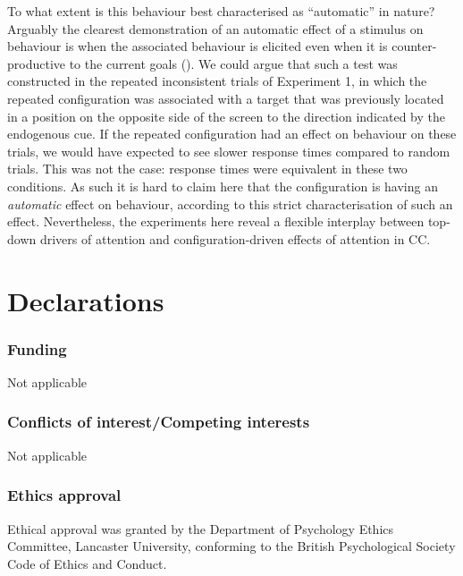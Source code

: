\documentclass[
  man,
  floatsintext,
  longtable,
  nolmodern,
  notxfonts,
  notimes,
  colorlinks=true,linkcolor=blue,citecolor=blue,urlcolor=blue]{apa7}
\begin{document}
To what extent is this behaviour best characterised as ``automatic'' in
nature? Arguably the clearest demonstration of an automatic effect of a
stimulus on behaviour is when the associated behaviour is elicited even
when it is counter-productive to the current goals
(). We could argue
that such a test was constructed in the repeated inconsistent trials of
Experiment 1, in which the repeated configuration was associated with a
target that was previously located in a position on the opposite side of
the screen to the direction indicated by the endogenous cue. If the
repeated configuration had an effect on behaviour on these trials, we
would have expected to see slower response times compared to random
trials. This was not the case: response times were equivalent in these
two conditions. As such it is hard to claim here that the configuration
is having an \emph{automatic} effect on behaviour, according to this
strict characterisation of such an effect. Nevertheless, the experiments
here reveal a flexible interplay between top-down drivers of attention
and configuration-driven effects of attention in CC.

\newpage

\section{Declarations}\label{declarations}

\subsubsection{Funding}\label{funding}

Not applicable

\subsubsection{Conflicts of interest/Competing
interests}\label{conflicts-of-interestcompeting-interests}

Not applicable

\subsubsection{Ethics approval}\label{ethics-approval}

Ethical approval was granted by the Department of Psychology Ethics
Committee, Lancaster University, conforming to the British Psychological
Society Code of Ethics and Conduct.
\end{document}
